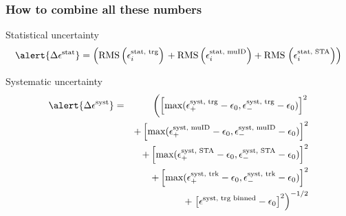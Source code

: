 \documentclass[10pt]{beamer}
\begin{document}
 \begin{frame}
  \frametitle{How to combine all these numbers}
  
  
  \begin{block}{Statistical uncertainty}
   \begin{equation*}
    \alert{\Delta\epsilon^\text{stat}}  =  \left( \text{RMS} \left( \epsilon^\text{stat, trg}_i \right) \right.
     + \text{RMS} \left( \epsilon^\text{stat, muID}_i \right) 
     + \text{RMS} \left. \left( \epsilon^\text{stat, STA}_i \right) \right) 
   \end{equation*}

  \end{block}
  
  \begin{block}{Systematic uncertainty}
   \begin{eqnarray}
    \alert{\Delta\epsilon^\text{syst}}  & = &  \left(\left[\text{max} (\epsilon^\text{syst, trg}_{+} - \epsilon_0, \epsilon^\text{syst, trg}_{-} - \epsilon_0)\right]^2\right.\nonumber\\
    &&+ \left[\text{max} (\epsilon^\text{syst, muID}_{+} - \epsilon_0, \epsilon^\text{syst, muID}_{-} - \epsilon_0)\right]^2\nonumber\\
    &&+ \left[\text{max} (\epsilon^\text{syst, STA}_{+} - \epsilon_0, \epsilon^\text{syst, STA}_{-} - \epsilon_0)\right]^2\nonumber\\
    &&+ \left[\text{max} (\epsilon^\text{syst, trk}_{+} - \epsilon_0, \epsilon^\text{syst, trk}_{-} - \epsilon_0)\right]^2\nonumber\\
    &&+ \left.\left[\epsilon^\text{syst, trg binned} - \epsilon_0\right]^2\right)^{-1/2}\nonumber
   \end{eqnarray}

  \end{block}

 \end{frame}
\end{document}
